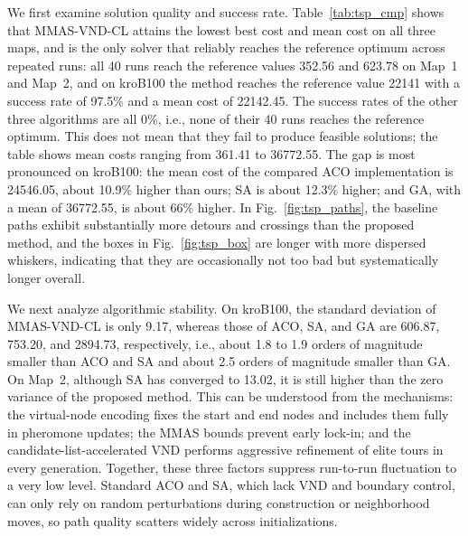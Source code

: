 \documentclass[lettersize,journal]{IEEEtran}
\begin{document}
We first examine solution quality and success rate. Table~\textcolor{blue}{\ref{tab:tsp_cmp}} shows that MMAS-VND-CL attains the lowest best cost and mean cost on all three maps, and is the only solver that reliably reaches the reference optimum across repeated runs: all 40 runs reach the reference values 352.56 and 623.78 on Map~1 and Map~2, and on kroB100 the method reaches the reference value 22141 with a success rate of 97.5\% and a mean cost of 22142.45. The success rates of the other three algorithms are all 0\%, i.e., none of their 40 runs reaches the reference optimum. This does not mean that they fail to produce feasible solutions; the table shows mean costs ranging from 361.41 to 36772.55. The gap is most pronounced on kroB100: the mean cost of the compared ACO implementation is 24546.05, about 10.9\% higher than ours; SA is about 12.3\% higher; and GA, with a mean of 36772.55, is about 66\% higher. In Fig.~\textcolor{blue}{\ref{fig:tsp_paths}}, the baseline paths exhibit substantially more detours and crossings than the proposed method, and the boxes in Fig.~\textcolor{blue}{\ref{fig:tsp_box}} are longer with more dispersed whiskers, indicating that they are occasionally not too bad but systematically longer overall.

We next analyze algorithmic stability. On kroB100, the standard deviation of MMAS-VND-CL is only 9.17, whereas those of ACO, SA, and GA are 606.87, 753.20, and 2894.73, respectively, i.e., about 1.8 to 1.9 orders of magnitude smaller than ACO and SA and about 2.5 orders of magnitude smaller than GA. On Map~2, although SA has converged to 13.02, it is still higher than the zero variance of the proposed method. This can be understood from the mechanisms: the virtual-node encoding fixes the start and end nodes and includes them fully in pheromone updates; the MMAS bounds prevent early lock-in; and the candidate-list-accelerated VND performs aggressive refinement of elite tours in every generation. Together, these three factors suppress run-to-run fluctuation to a very low level. Standard ACO and SA, which lack VND and boundary control, can only rely on random perturbations during construction or neighborhood moves, so path quality scatters widely across initializations.
\end{document}
